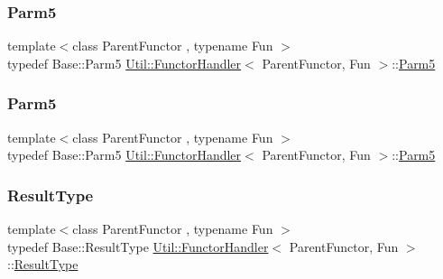 \mbox{\label{classUtil_1_1FunctorHandler_aeb1492d58534bb15702063e862e459c6}} 
\subsubsection{\texorpdfstring{Parm5}{Parm5}\hspace{0.1cm}{\footnotesize\ttfamily [1/2]}}
{\footnotesize\ttfamily template$<$class Parent\+Functor , typename Fun $>$ \\
typedef Base\+::\+Parm5 \mbox{\hyperlink{classUtil_1_1FunctorHandler}{Util\+::\+Functor\+Handler}}$<$ Parent\+Functor, Fun $>$\+::\mbox{\hyperlink{classUtil_1_1FunctorHandler_aeb1492d58534bb15702063e862e459c6}{Parm5}}}

\mbox{\label{classUtil_1_1FunctorHandler_aeb1492d58534bb15702063e862e459c6}} 
\subsubsection{\texorpdfstring{Parm5}{Parm5}\hspace{0.1cm}{\footnotesize\ttfamily [2/2]}}
{\footnotesize\ttfamily template$<$class Parent\+Functor , typename Fun $>$ \\
typedef Base\+::\+Parm5 \mbox{\hyperlink{classUtil_1_1FunctorHandler}{Util\+::\+Functor\+Handler}}$<$ Parent\+Functor, Fun $>$\+::\mbox{\hyperlink{classUtil_1_1FunctorHandler_aeb1492d58534bb15702063e862e459c6}{Parm5}}}

\mbox{\label{classUtil_1_1FunctorHandler_a036da44b8cc2567704cebd2a20d16c80}} 
\subsubsection{\texorpdfstring{ResultType}{ResultType}\hspace{0.1cm}{\footnotesize\ttfamily [1/2]}}
{\footnotesize\ttfamily template$<$class Parent\+Functor , typename Fun $>$ \\
typedef Base\+::\+Result\+Type \mbox{\hyperlink{classUtil_1_1FunctorHandler}{Util\+::\+Functor\+Handler}}$<$ Parent\+Functor, Fun $>$\+::\mbox{\hyperlink{classUtil_1_1FunctorHandler_a036da44b8cc2567704cebd2a20d16c80}{Result\+Type}}}

